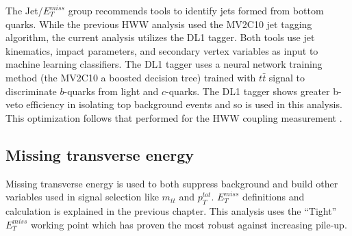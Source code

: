 The Jet/$E_T^{miss}$ group recommends tools to identify jets formed from bottom quarks. While the previous HWW analysis used the MV2C10 jet tagging algorithm, the current analysis utilizes the DL1 tagger. Both tools use jet kinematics, impact parameters, and secondary vertex variables as input to machine learning classifiers. The DL1 tagger uses a neural network training method (the MV2C10 a boosted decision tree) trained with $t\bar{t}$ signal to discriminate $b$-quarks from light and $c$-quarks. The DL1 tagger shows greater b-veto efficiency in isolating top background events and so is used in this analysis. This optimization follows that performed for the HWW coupling measurement \cite{HWWCoupling}. 

\subsection{Missing transverse energy}

Missing transverse energy is used to both suppress background and build other variables used in signal selection like $m_{tt}$ and $p_T^{tot}$. $E_T^{miss}$ definitions and calculation is explained in the previous chapter. This analysis uses the ``Tight'' $E_T^{miss}$ working point which has proven the most robust against increasing pile-up.

